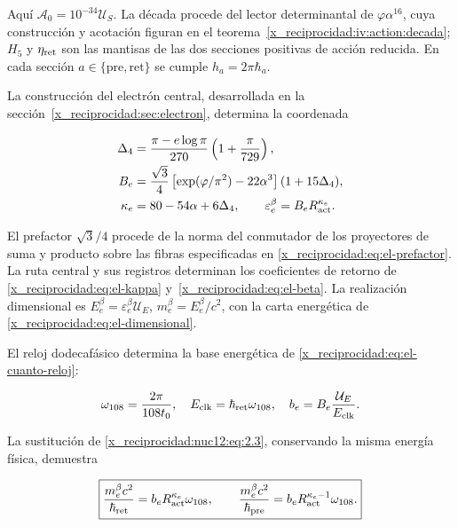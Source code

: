 Aquí \(\mathcal A_0=10^{-34}\mathcal U_S\). La década procede del lector determinantal de \(\varphi\alpha^{16}\), cuya construcción y acotación figuran en el teorema~\ref{x_reciprocidad:iv:action:decada}; \(H_5\) y \(\eta_{\rm ret}\) son las mantisas de las dos secciones positivas de acción reducida. En cada sección \(a\in\{\mathrm{pre},\mathrm{ret}\}\) se cumple \(h_a=2\pi\hbar_a\).

La construcción del electrón central, desarrollada en la sección~\ref{x_reciprocidad:sec:electron}, determina la coordenada



\begin{equation}
\begin{aligned}
\Delta_4&=\frac{\pi-e\log\pi}{270}\left(1+\frac{\pi}{729}\right),\\
B_e&=\frac{\sqrt3}{4}
\left[\exp(\varphi/\pi^2)-22\alpha^3\right](1+15\Delta_4),\\
\kappa_e&=80-54\alpha+6\Delta_4,\qquad
\varepsilon_e^\beta=B_eR_{\rm act}^{\kappa_e}.
\end{aligned}
\label{x_reciprocidad:nuc12:eq:2.3}
\end{equation}



El prefactor \(\sqrt3/4\) procede de la norma del conmutador de los proyectores de suma y producto sobre las fibras especificadas en \eqref{x_reciprocidad:eq:el-prefactor}. La ruta central y sus registros determinan los coeficientes de retorno de \eqref{x_reciprocidad:eq:el-kappa} y~\eqref{x_reciprocidad:eq:el-beta}. La realización dimensional es \(E_e^\beta=\varepsilon_e^\beta\mathcal U_E\), \(m_e^\beta=E_e^\beta/c^2\), con la carta energética de \eqref{x_reciprocidad:eq:el-dimensional}.

El reloj dodecafásico determina la base energética de \eqref{x_reciprocidad:eq:el-cuanto-reloj}:



\[
\omega_{108}=\frac{2\pi}{108t_0},\quad
E_{\rm clk}=\hbar_{\rm ret}\omega_{108},\quad
b_e=B_e\frac{\mathcal U_E}{E_{\rm clk}}.
\]



La sustitución de \eqref{x_reciprocidad:nuc12:eq:2.3}, conservando la misma energía física, demuestra



\begin{equation}
\boxed{\frac{m_e^\beta c^2}{\hbar_{\rm ret}}
=b_eR_{\rm act}^{\kappa_e}\omega_{108},\qquad
\frac{m_e^\beta c^2}{\hbar_{\rm pre}}
=b_eR_{\rm act}^{\kappa_e-1}\omega_{108}.}
\label{x_reciprocidad:nuc12:eq:2.4}
\end{equation}



